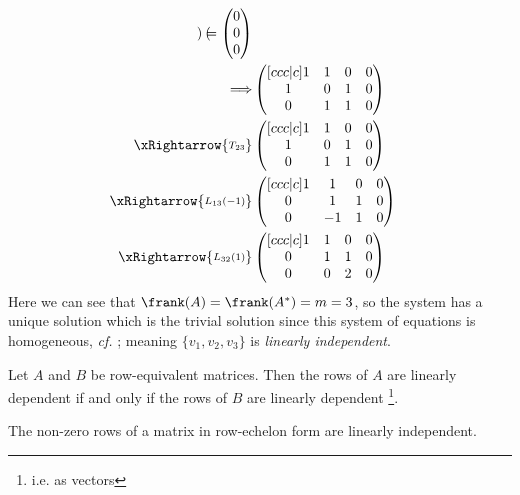 \begin{exm}
\begin{flushleft}
\begin{align*}
\begin{pmatrix}
			\end{pmatrix}=
			\begin{pmatrix}
				0 \\
				0 \\
				0
			\end{pmatrix}             \\
			\Longrightarrow
			         & \begin{pmatrix}[ccc|c]
				1 & 1 & 0 & 0 \\
				1 & 0 & 1 & 0 \\
				0 & 1 & 1 & 0
			\end{pmatrix} \\
			\xRightarrow{\substack{T_{23}}}
			         & \begin{pmatrix}[ccc|c]
				1 & 1 & 0 & 0 \\
				1 & 0 & 1 & 0 \\
				0 & 1 & 1 & 0
			\end{pmatrix} \\
			\xRightarrow{\substack{L_{13}(-1)}}
			         & \begin{pmatrix}[ccc|c]
				1 & 1  & 0 & 0 \\
				0 & 1  & 1 & 0 \\
				0 & -1 & 1 & 0
			\end{pmatrix} \\
			\xRightarrow{\substack{L_{32}(1)}}
			         & \begin{pmatrix}[ccc|c]
				1 & 1 & 0 & 0 \\
				0 & 1 & 1 & 0 \\
				0 & 0 & 2 & 0
			\end{pmatrix}
		\end{align*}
		Here we can see that $\frank(A)=\frank(A^*)=m=3$, so the system has a
		unique solution which is the trivial solution since this system of
		equations is homogeneous, \textit{cf.} ;
		meaning $\{v_1,v_2,v_3\}$ is \textit{linearly independent}.
	\end{flushleft}
\end{exm}

\begin{thm}\label{thm-row-equivalent-matrices-linearly-dependent}
	Let $A$ and $B$ be row-equivalent matrices. Then the rows of $A$ are linearly
	dependent if and only if the rows of $B$ are linearly dependent
	\footnote{i.e. as vectors}.
\end{thm}

\begin{thm}\label{thm-non-zero-rows-echelon-form-linearly-independent}
	The non-zero rows of a matrix in row-echelon form are linearly independent.
\end{thm}

